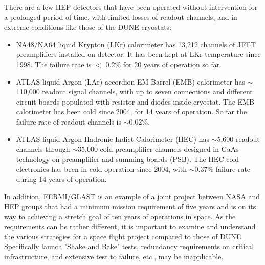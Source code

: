 There are a few HEP detectors that have been operated without intervention for a prolonged period of time, with limited losses of readout channels, and in extreme conditions like those of the DUNE cryostats:
\begin{itemize}
	\item NA48/NA64 liquid Krypton (LKr) calorimeter has 13,212 channels of JFET preamplifiers installed on detector. It has been kept at LKr temperature since 1998. The failure rate is $<$ 0.2\% for 20 years of operation so far.
	\item ATLAS liquid Argon (LAr) accordion EM Barrel (EMB) calorimeter has $\sim$110,000 readout signal channels, with up to seven connections and different circuit boards populated with resistor and diodes inside cryostat. The EMB calorimeter has been cold since 2004, for 14 years of operation.  So far the failure rate of readout channels is $\sim$0.02\%.
	\item ATLAS liquid Argon Hadronic Indict Calorimeter (HEC) has $\sim$5,600 readout channels through $\sim$35,000 cold preamplifier channels designed in GaAs technology on preamplifier and summing boards (PSB). The HEC cold electronics has been in cold operation since 2004, with $\sim$0.37\% failure rate during 14 years of operation. 
\end{itemize}
In addition, FERMI/GLAST is an example of a joint project between NASA and HEP groups that had a minimum mission requirement of five years and is on its way to achieving a stretch goal of ten years of operations in space. As the requirements can be rather different, it is important to examine and understand the various strategies for a space flight project compared to those of DUNE. Specifically launch "Shake and Bake" tests, redundancy requirements on critical infrastructure, and extensive test to failure, etc., may be inapplicable.


